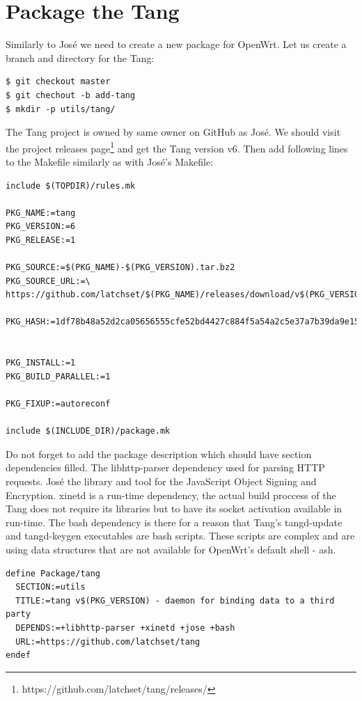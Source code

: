 \section{Package the Tang}
Similarly to José we need to create a new package for OpenWrt.
Let us create a branch and directory for the Tang:
\begin{lstlisting}[columns=fixed,basicstyle=\ttfamily\footnotesize,tabsize=4,backgroundcolor=\color{yellow!10}]
$ git checkout master
$ git chechout -b add-tang
$ mkdir -p utils/tang/
\end{lstlisting}
The Tang project is owned by same owner on GitHub as José.
We should visit the project releases page\footnote{https://github.com/latchset/tang/releases/} and get the Tang version v6.
Then add following lines to the Makefile similarly as with José's Makefile:
\begin{lstlisting}[columns=fixed,basicstyle=\ttfamily\footnotesize,tabsize=4,backgroundcolor=\color{yellow!10}]
include $(TOPDIR)/rules.mk

PKG_NAME:=tang
PKG_VERSION:=6
PKG_RELEASE:=1

PKG_SOURCE:=$(PKG_NAME)-$(PKG_VERSION).tar.bz2
PKG_SOURCE_URL:=\
https://github.com/latchset/$(PKG_NAME)/releases/download/v$(PKG_VERSION)/

PKG_HASH:=1df78b48a52d2ca05656555cfe52bd4427c884f5a54a2c5e37a7b39da9e155e3


PKG_INSTALL:=1
PKG_BUILD_PARALLEL:=1

PKG_FIXUP:=autoreconf

include $(INCLUDE_DIR)/package.mk
\end{lstlisting}
Do not forget to add the package description which should have section dependencies filled.
The libhttp-parser dependency used for parsing HTTP requests.
José the library and tool for the JavaScript Object Signing and Encryption.
xinetd is a run-time dependency, the actual build proccess of the Tang does not require its libraries but to have its socket activation available in run-time.
The bash dependency is there for a reason that Tang's tangd-update and tangd-keygen executables are bash scripts.
These scripts are complex and are using data structures that are not available for OpenWrt's default shell - ash.
\begin{lstlisting}[columns=fixed,basicstyle=\ttfamily\footnotesize,tabsize=4,backgroundcolor=\color{yellow!10}]
define Package/tang
  SECTION:=utils
  TITLE:=tang v$(PKG_VERSION) - daemon for binding data to a third party
  DEPENDS:=+libhttp-parser +xinetd +jose +bash
  URL:=https://github.com/latchset/tang
endef
\end{lstlisting}

